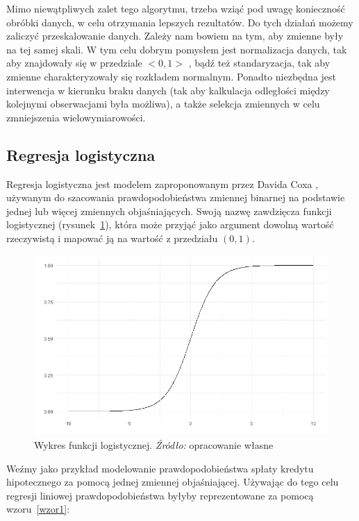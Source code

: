 \documentclass[12pt,a4paper,twoside,openany]{book}
\begin{document}
Mimo niewątpliwych zalet tego algorytmu, trzeba wziąć pod uwagę konieczność obróbki danych, w celu otrzymania lepszych rezultatów. Do tych działań możemy zaliczyć przeskalowanie danych. Zależy nam bowiem na tym, aby zmienne były na tej samej skali. W tym celu dobrym pomysłem jest normalizacja danych, tak aby znajdowały się w przedziale $<0,1>$ , bądź też standaryzacja, tak aby zmienne charakteryzowały się rozkładem normalnym. Ponadto niezbędna jest interwencja w kierunku braku danych (tak aby kalkulacja odległości między kolejnymi obserwacjami była możliwa), a także selekcja zmiennych w celu zmniejszenia wielowymiarowości.

\subsection{Regresja logistyczna}

Regresja logistyczna jest modelem zaproponowanym przez Davida Coxa \citep{cox1958}, używanym do szacowania prawdopodobieństwa zmiennej binarnej na podstawie jednej lub więcej zmiennych objaśniających. Swoją nazwę zawdzięcza funkcji logistycznej (rysunek~\ref{rys002}), która może przyjąć jako argument dowolną wartość rzeczywistą i mapować ją na wartość z przedziału $(0,1)$. 

\begin{figure}
\centering
\includegraphics[scale=0.7]{./rys002}
\caption{Wykres funkcji logistycznej. \textit{Źródło:} opracowanie własne}\label{rys002}
\end{figure}

Weźmy jako przykład modelowanie prawdopodobieństwa spłaty kredytu hipotecznego za pomocą jednej zmiennej objaśniającej. Używając do tego celu regresji liniowej prawdopodobieństwa byłyby reprezentowane za pomocą wzoru~\ref{wzor1}:
\end{document}
